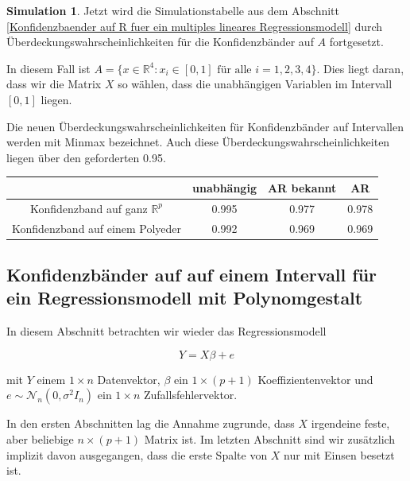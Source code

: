 \documentclass[12pt,a4paper]{article}
\theoremstyle{definition}
\theoremstyle{definition}
\theoremstyle{definition}
\newtheorem{Simulation}[Definition]{Simulation}
\theoremstyle{definition}
\newcommand{\UeberRR}{0.995}
\newcommand{\UeberRMinmax}{0.992}
\newcommand{\UeberARbekanntR}{0.977}
\newcommand{\UeberARbekanntMinmax}{0.969}
\newcommand{\UeberARR}{0.978}
\newcommand{\UeberARMinmax}{0.969}
\begin{document}
\begin{Simulation}
Jetzt wird die Simulationstabelle aus dem Abschnitt \ref{Konfidenzbaender auf R fuer ein multiples lineares Regressionsmodell} durch Überdeckungswahrscheinlichkeiten für die Konfidenzbänder auf $A$ fortgesetzt. 

In diesem Fall ist $A = \{x \in \mathbb{R}^4 : x_i \in [0,1] \text{ für alle } i=1, 2, 3, 4 \}$. Dies liegt daran, dass wir die Matrix $X$ so wählen, dass die unabhängigen Variablen im Intervall $[0,1]$ liegen.

Die neuen Überdeckungswahrscheinlichkeiten für Konfidenzbänder auf Intervallen werden mit Minmax bezeichnet. Auch diese Überdeckungswahrscheinlichkeiten liegen über den geforderten 0.95.

\begin{center}
\begin{tabular}{|c|c|c|c|}
\hline 
 & unabhängig & AR bekannt & AR \\ 
\hline 
Konfidenzband auf ganz $\mathbb{R}^{p}$		 & \UeberRR		  & \UeberARbekanntR & \UeberARR \\ 
\hline 
Konfidenzband auf einem Polyeder	 & \UeberRMinmax  & \UeberARbekanntMinmax & \UeberARMinmax \\ 
\hline 
\end{tabular} 
\end{center}

\end{Simulation}


\newpage
\subsection{Konfidenzbänder auf auf einem Intervall für ein Regressionsmodell mit Polynomgestalt}
\label{Konfidenzbaenderauf auf einem Intervall für Regressionsmodell mit Polynomgestalt}
In diesem Abschnitt betrachten wir wieder das Regressionsmodell 

\begin{equation*}
Y=X\beta+e
\end{equation*}

mit $Y$ einem $1 \times n$ Datenvektor, $\beta$ ein $1 \times (p+1)$ Koeffizientenvektor und $e \sim \mathscr{N}_{n}(0,\sigma^2 I_n )$ ein $1 \times n$ Zufallsfehlervektor.

In den ersten Abschnitten lag die Annahme zugrunde, dass $X$ irgendeine feste, aber beliebige $n \times (p+1)$ Matrix ist. Im letzten Abschnitt sind wir zusätzlich implizit davon ausgegangen, dass die erste Spalte von $X$ nur mit Einsen besetzt ist.
\end{document}
